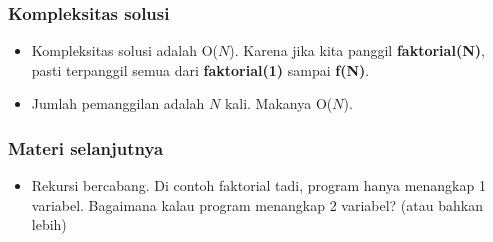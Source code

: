 \begin{frame}
\frametitle{Kompleksitas solusi}
\begin {itemize}
  \item Kompleksitas solusi adalah O($N$). Karena jika kita panggil \alert{\textbf{faktorial(N)}}, pasti terpanggil semua dari \alert{\textbf{faktorial(1)}} sampai \alert{\textbf{f(N)}}.
  \item Jumlah pemanggilan adalah $N$ kali. Makanya O($N$).
\end {itemize}
\end{frame}

\begin{frame}
\frametitle{Materi selanjutnya}
\begin{itemize}
  \item Rekursi bercabang. Di contoh faktorial tadi, program hanya menangkap 1 variabel. Bagaimana kalau program menangkap 2 variabel? (atau bahkan lebih)
\end {itemize}
\end{frame}


